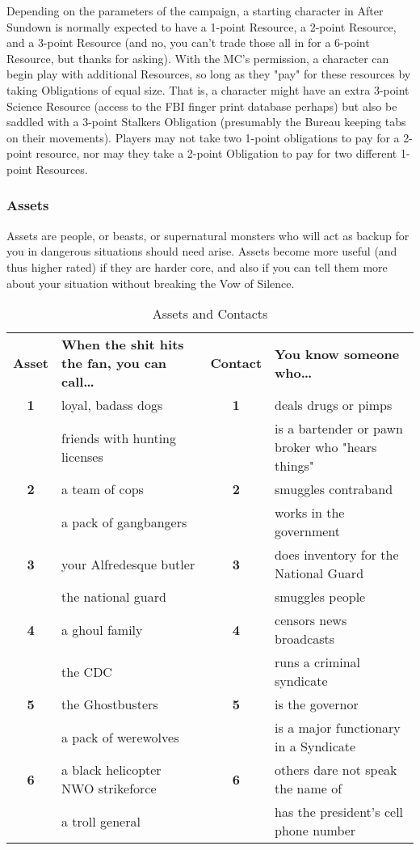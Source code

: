 Depending on the parameters of the campaign, a starting character in After Sundown is normally expected to have a 1-point Resource, a 2-point Resource, and a 3-point Resource (and no, you can't trade those all in for a 6-point Resource, but thanks for asking). With the MC's permission, a character can begin play with additional Resources, so long as they "pay" for these resources by taking Obligations of equal size. That is, a character might have an extra 3-point Science Resource (access to the FBI finger print database perhaps) but also be saddled with a 3-point Stalkers Obligation (presumably the Bureau keeping tabs on their movements). Players may not take two 1-point obligations to pay for a 2-point resource, nor may they take a 2-point Obligation to pay for two different 1-point Resources.

\subsubsection{Assets}

\hspace{\parindent} Assets are people, or beasts, or supernatural monsters who will act as backup for you in dangerous situations should need arise. Assets become more useful (and thus higher rated) if they are harder core, and also if you can tell them more about your situation without breaking the Vow of Silence.

\begin{table}[htb] \center
\caption{Assets and Contacts}
\begin{tabular}{c p{6cm} c p{6.5cm}}
\textbf{Asset} & \textbf{When the shit hits the fan, you can call\ldots{}}&\textbf{Contact} & \textbf{You know someone who\ldots{}}\\
\textbf{1} &  loyal, badass dogs&\textbf{1}  &    deals drugs or pimps\\
& friends with hunting licenses&& is a bartender or pawn broker who "hears things"\\
\textbf{2}  &    a team of cops&\textbf{2}  &    smuggles contraband\\
& a pack of gangbangers&& works in the government\\
\textbf{3}  &    your Alfredesque butler&\textbf{3}  &    does inventory for the National Guard\\
& the national guard&& smuggles people\\
\textbf{4}  &    a ghoul family&\textbf{4}  &    censors news broadcasts\\
& the CDC&& runs a criminal syndicate\\
\textbf{5}  &    the Ghostbusters&\textbf{5}  &    is the governor\\
& a pack of werewolves&& is a major functionary in a Syndicate\\
\textbf{6}  &    a black helicopter NWO strikeforce&\textbf{6}  &    others dare not speak the name of\\
& a troll general&& has the president's cell phone number\\
\end{tabular}
\end{table}

